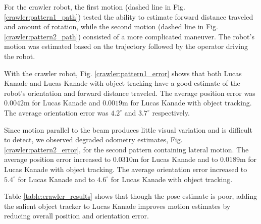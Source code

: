 \documentclass[letterpaper, 10 pt, conference]{ieeeconf}
\begin{document}
For the crawler robot, the first motion (dashed line in Fig. \ref{crawler:pattern1_path}) tested the ability to estimate forward distance traveled and amount of rotation, while the second motion  (dashed line in Fig. \ref{crawler:pattern2_path}) consisted of a more complicated maneuver. The robot's motion was estimated based on the trajectory followed by the operator driving the robot.

With the crawler robot, Fig. \ref{crawler:pattern1_error} shows that both Lucas Kanade and Lucas Kanade with object tracking have a good estimate of the robot's orientation and forward distance traveled. The average position error was $0.0042$m for Lucas Kanade and $0.0019$m for Lucas Kanade with object tracking. The average orientation error was $4.2^{\circ}$ and $3.7^{\circ}$ respectively. 

Since motion parallel to the beam produces little visual variation and is difficult to detect, we observed degraded odometry estimates, Fig. \ref{crawler:pattern2_error}, for the second pattern containing lateral motion. The average position error increased to $0.0310$m for Lucas Kanade and to $0.0189$m for Lucas Kanade with object tracking. The average orientation error increased to $5.4^{\circ}$ for Lucas Kanade and to $4.6^{\circ}$ for Lucas Kanade with object tracking.

Table \ref{table:crawler_results} shows that though the pose estimate is poor, adding the salient object tracker to Lucas Kanade improves motion estimates by reducing overall position and orientation error.
\end{document}
